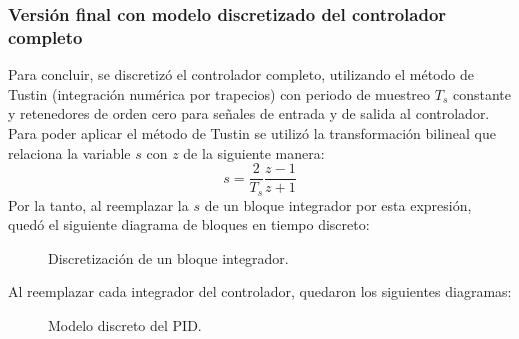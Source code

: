 \documentclass[a4paper, 10pt, onecolumn,journal]{ieeeconf}
\begin{document}
\subsubsection{\textbf{Versión final con modelo discretizado del controlador completo}} Para concluir, se discretizó el controlador completo, utilizando el método de Tustin (integración numérica por trapecios) con periodo de muestreo $T_s$ constante y retenedores de orden cero para señales de entrada y de salida al controlador.
Para poder aplicar el método de Tustin se utilizó la transformación bilineal que relaciona la variable $s$ con $z$ de la siguiente manera:
\label{subsubsec: Controlador discretizado}
\begin{equation}
	s = \frac{2}{T_s} \frac{z-1}{z+1}
	\label{Transformación bilineal}
\end{equation}
Por la tanto, al reemplazar la $s$ de un bloque integrador por esta expresión, quedó el siguiente diagrama de bloques en tiempo discreto:
\begin{figure}[H]
	\centering
	\begin{adjustbox}{max width=\columnwidth}
	\end{adjustbox}
	\caption{Discretización de un bloque integrador.}
	\label{Discretización de un bloque integrador}
\end{figure}
Al reemplazar cada integrador del controlador, quedaron los siguientes diagramas:
\begin{figure}[H]
	\centering
	\begin{adjustbox}{max width=\columnwidth}
	\end{adjustbox}
	\caption{Modelo discreto del PID.}
	\label{Modelo discreto del PID}
\end{figure}
\end{document}
